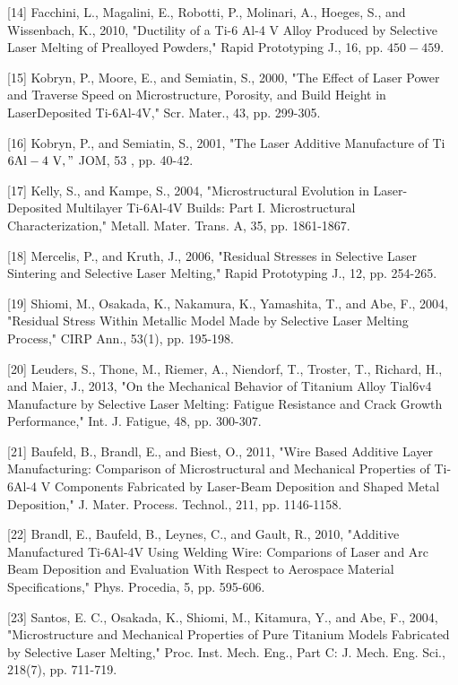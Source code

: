 \documentclass[10pt]{article}
\begin{document}
[14] Facchini, L., Magalini, E., Robotti, P., Molinari, A., Hoeges, S., and Wissenbach, K., 2010, "Ductility of a Ti-6 Al-4 V Alloy Produced by Selective Laser Melting of Prealloyed Powders," Rapid Prototyping J., 16, pp. $450-459$.

[15] Kobryn, P., Moore, E., and Semiatin, S., 2000, "The Effect of Laser Power and Traverse Speed on Microstructure, Porosity, and Build Height in LaserDeposited Ti-6Al-4V," Scr. Mater., 43, pp. 299-305.

[16] Kobryn, P., and Semiatin, S., 2001, "The Laser Additive Manufacture of Ti$6 \mathrm{Al}-4 \mathrm{~V}, "$ JOM, 53 , pp. 40-42.

[17] Kelly, S., and Kampe, S., 2004, "Microstructural Evolution in Laser-Deposited Multilayer Ti-6Al-4V Builds: Part I. Microstructural Characterization," Metall. Mater. Trans. A, 35, pp. 1861-1867.

[18] Mercelis, P., and Kruth, J., 2006, "Residual Stresses in Selective Laser Sintering and Selective Laser Melting," Rapid Prototyping J., 12, pp. 254-265.

[19] Shiomi, M., Osakada, K., Nakamura, K., Yamashita, T., and Abe, F., 2004, "Residual Stress Within Metallic Model Made by Selective Laser Melting Process," CIRP Ann., 53(1), pp. 195-198.

[20] Leuders, S., Thone, M., Riemer, A., Niendorf, T., Troster, T., Richard, H., and Maier, J., 2013, "On the Mechanical Behavior of Titanium Alloy Tial6v4 Manufacture by Selective Laser Melting: Fatigue Resistance and Crack Growth Performance," Int. J. Fatigue, 48, pp. 300-307.

[21] Baufeld, B., Brandl, E., and Biest, O., 2011, "Wire Based Additive Layer Manufacturing: Comparison of Microstructural and Mechanical Properties of Ti-6Al-4 V Components Fabricated by Laser-Beam Deposition and Shaped Metal Deposition," J. Mater. Process. Technol., 211, pp. 1146-1158.

[22] Brandl, E., Baufeld, B., Leynes, C., and Gault, R., 2010, "Additive Manufactured Ti-6Al-4V Using Welding Wire: Comparions of Laser and Arc Beam Deposition and Evaluation With Respect to Aerospace Material Specifications," Phys. Procedia, 5, pp. 595-606.

[23] Santos, E. C., Osakada, K., Shiomi, M., Kitamura, Y., and Abe, F., 2004, "Microstructure and Mechanical Properties of Pure Titanium Models Fabricated by Selective Laser Melting," Proc. Inst. Mech. Eng., Part C: J. Mech. Eng. Sci., 218(7), pp. 711-719.
\end{document}
